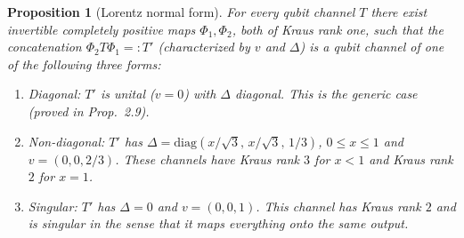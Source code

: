 \documentclass[11pt,a4paper]{article}
\numberwithin{equation}{section}
\theoremstyle{plain}
\newtheorem{proposition}{Proposition}[section]
\theoremstyle{definition}
\begin{document}
\begin{proposition}[Lorentz normal form]
    For every qubit channel $T$ there exist invertible completely positive maps
    $\Phi_1,\Phi_2$, both of Kraus rank one, such that the concatenation
    $\Phi_2T\Phi_1 =: T'$ (characterized by $v$ and $\Delta$) is a qubit channel of
    one of the following three forms:
    \begin{enumerate}
        \item Diagonal: $T'$ is unital ($v=0$) with $\Delta$ diagonal. This is the generic
              case (proved in Prop.~2.9).
        \item Non-diagonal: $T'$ has $\Delta=\mathrm{diag}(x/\sqrt{3},\,x/\sqrt{3},\,1/3)$,
              $0\le x \le 1$ and $v=(0,0,2/3)$. These channels have Kraus rank $3$ for $x<1$
              and Kraus rank $2$ for $x=1$.
        \item Singular: $T'$ has $\Delta=0$ and $v=(0,0,1)$. This channel has Kraus rank
              $2$ and is singular in the sense that it maps everything onto the same output.
    \end{enumerate}
\end{proposition}
\end{document}
